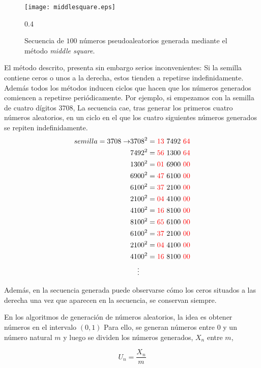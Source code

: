 \begin{figure}[h]
\centering
\texttt{[image: middlesquare.eps]}
\caption{Secuencia de $100$ números pseudoaleatorios generada mediante el método \emph{middle square}.}
\label{fig:middlesquare}0.4
\end{figure}

El método descrito, presenta sin embargo serios inconvenientes: Si la semilla contiene ceros o unos a la derecha, estos tienden a repetirse indefinidamente. Además todos los métodos inducen ciclos que hacen que los números generados comiencen a repetirse periódicamente. Por ejemplo, si empezamos con la semilla de cuatro dígitos $3708$,  La secuencia cae, tras generar los primeros cuatro números aleatorios, en un ciclo en el que los cuatro siguientes números generados se repiten indefinidamente.
\begin{align*}
semilla=3708 \rightarrow
&3708^2={\color{red}13}\ 7492\ {\color{red}64}\\
&7492^2={\color{red}56}\ 1300\ {\color{red}64}\\
&1300^2={\color{red}01}\ 6900\ {\color{red}00}\\
&6900^2={\color{red}47}\ 6100\ {\color{red}00}\\
&6100^2={\color{red}37}\ 2100\ {\color{red}00}\\
&2100^2={\color{red}04}\ 4100\ {\color{red}00}\\
&4100^2={\color{red}16}\ 8100\ {\color{red}00}\\
&8100^2={\color{red}65}\ 6100\ {\color{red}00}\\
&6100^2={\color{red}37}\ 2100\ {\color{red}00}\\
&2100^2={\color{red}04}\ 4100\ {\color{red}00}\\
&4100^2={\color{red}16}\ 8100\ {\color{red}00}\\
&\ \ \ \vdots
\end{align*}

Además, en la secuencia generada puede observarse cómo los ceros situados a las derecha una vez que aparecen en la secuencia, se conservan siempre.

En los algoritmos de generación de números aleatorios, la idea es obtener números en el intervalo $(0,1)$ Para ello, se generan números entre $0$ y un número natural $m$ y luego se dividen los números generados, $X_n$ entre $m$,

\begin{equation*}
U_n=\frac{X_n}{m}
\end{equation*}

